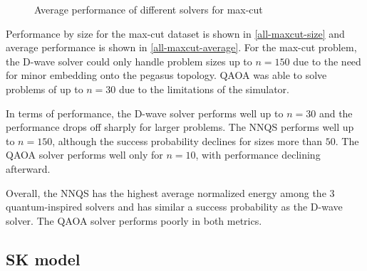 \begin{figure}[!htbp]
    \centering
    \hfill
    \caption{Average performance of different solvers for max-cut}
    \label{all-maxcut-average}
\end{figure}

Performance by size for the max-cut dataset is shown in \autoref{all-maxcut-size} and average performance is shown in \autoref{all-maxcut-average}. For the max-cut problem, the D-wave solver could only handle problem sizes up to $n=150$ due to the need for minor embedding onto the pegasus topology. QAOA was able to solve problems of up to $n=30$ due to the limitations of the simulator.

In terms of performance, the D-wave solver performs well up to $n=30$ and the performance drops off sharply for larger problems. The NNQS performs well up to $n=150$, although the success probability declines for sizes more than $50$. The QAOA solver performs well only for $n=10$, with performance declining afterward.

Overall, the NNQS has the highest average normalized energy among the 3 quantum-inspired solvers and has similar a success probability as the D-wave solver. The QAOA solver performs poorly in both metrics.

\subsection{SK model}

